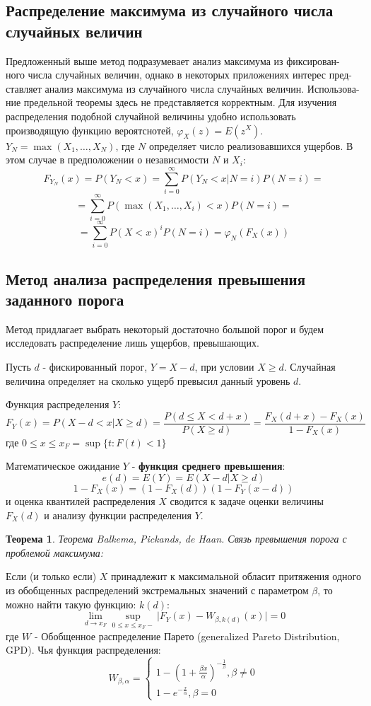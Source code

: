 \documentclass[%
12pt, %
final, %
oneside, %
onecolumn, %
centertags]{article} %
\theoremstyle{plain}
\newtheorem{theorem}{Теорема}[section] %
\theoremstyle{definition}
\theoremstyle{remark}
\begin{document}
\subsection{Распределение максимума из случайного числа случайных величин}

Предложенный выше метод подразумевает анализ максимума из фиксирован-
ного числа случайных величин, однако в некоторых приложениях интерес пред-
ставляет анализ максимума из случайного числа случайных величин. Использова-
ние предельной теоремы здесь не представляется корректным. Для изучения распределения подобной случайной величины удобно использовать производящую функцию вероятснотей, $\varphi_X(z) = E(z^X)$. $Y_N = \max(X_1,\ldots, X_N)$, где $N$ определяет число реализовавшихся ущербов. В этом случае в предположении о независимости $N$ и $X_i$:
$$F_{Y_N}(x) = P(Y_N < x) = \sum\limits_{i=0}^{\infty}P(Y_N < x \vert N = i)P(N=i) = $$
$$ = \sum\limits_{i=0}^{\infty}P(\max(X_1, \ldots, X_i) <x) P(N=i) = $$
$$ = \sum\limits_{i=0}^{\infty}P(X<x)^iP(N=i) = \varphi_N(F_{X}(x))$$

\subsection{Метод анализа распределения превышения заданного порога}

Метод придлагает выбрать некоторый достаточно большой порог и будем исследовать распределение лишь ущербов, превышающих.

Пусть $d$ - фискированный порог, $Y = X - d$, при условии $X \geqslant d$. Случайная величина определяет на сколько ущерб превысил данный уровень $d$. 

Функция распределения $Y$:
$$F_{Y}(x) = P(X-d<x \vert X \geqslant d) = \frac{P(d\leqslant X < d+x)}{P(X \geqslant d)} = \frac{F_{X}(d+x) - F_{X}(x)}{1-F_{X}(x)}$$
где $0 \leqslant x \leqslant x_F = \sup\{t:F(t) < 1\}$

Математическое ожидание $Y$ - \textbf{функция среднего превышения}:
$$e(d) = E(Y) = E(X-d \vert X \geqslant d)$$
$$1 - F_{X}(x) = (1-F_{X}(d))(1-F_{Y}(x-d))$$
и оценка квантилей распределения $X$ сводится к задаче оценки величины $F_{X}(d)$ и анализу функции распределения $Y$.

\begin{theorem}
	Теорема Balkema, Pickands, de Haan. Связь превышения порога с проблемой максимума:
\end{theorem}

Если (и только если) $X$ принадлежит к максимальной обласит притяжения одного из обобщенных распределений экстремальных значений с параметром $\beta$, то можно найти такую функцию: $k(d)$:
$$\lim\limits_{d \to x_F} \sup\limits_{0 \leqslant x \leqslant x_F-} \vert F_{Y}(x) - W_{\beta, k(d)}(x) \vert = 0$$
где $W$ - Обобщенное распределение Парето (generalized Pareto Distribution, GPD). Чья функция распределения:
$$W_{\beta, \alpha} = \begin{cases}
	1 - \left(1+\frac{\beta x}{\alpha}\right)^{-\frac{1}{\beta}}, \beta \neq 0 \\
	1 - e^{-\frac{x}{\alpha}}, \beta  = 0
\end{cases}$$
\end{document}
